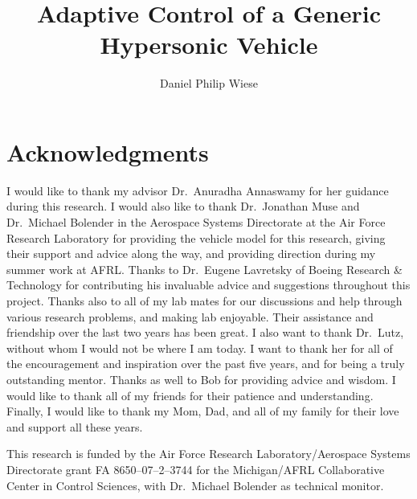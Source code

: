 \title{Adaptive Control of a Generic Hypersonic Vehicle}
\author{Daniel Philip Wiese}
\maketitle

\cleardoublepage%
\setcounter{savepage}{\thepage}
\begin{abstractpage}

\end{abstractpage}

\cleardoublepage%

\section*{Acknowledgments}

I would like to thank my advisor Dr.\ Anuradha Annaswamy for her guidance during this research.
I would also like to thank Dr.\ Jonathan Muse and Dr.\ Michael Bolender in the Aerospace Systems Directorate at the Air Force Research Laboratory for providing the vehicle model for this research, giving their support and advice along the way, and providing direction during my summer work at AFRL.\@
Thanks to Dr.\ Eugene Lavretsky of Boeing Research \& Technology for contributing his invaluable advice and suggestions throughout this project.
Thanks also to all of my lab mates for our discussions and help through various research problems, and making lab enjoyable.
Their assistance and friendship over the last two years has been great.
I also want to thank Dr.\ Lutz, without whom I would not be where I am today.
I want to thank her for all of the encouragement and inspiration over the past five years, and for being a truly outstanding mentor.
Thanks as well to Bob for providing advice and wisdom.
I would like to thank all of my friends for their patience and understanding.
Finally, I would like to thank my Mom, Dad, and all of my family for their love and support all these years.

This research is funded by the Air Force Research Laboratory/Aerospace Systems Directorate grant FA 8650--07--2--3744 for the Michigan/AFRL Collaborative Center in Control Sciences, with Dr.\ Michael Bolender as technical monitor.
